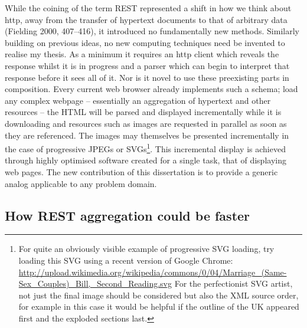 \documentclass[]{article}
\begin{document}
While the coining of the term REST represented a shift in how we think
about http, away from the transfer of hypertext documents to that of
arbitrary data (Fielding 2000, 407--416), it introduced no fundamentally
new methods. Similarly building on previous ideas, no new computing
techniques need be invented to realise my thesis. As a minimum it
requires an http client which reveals the response whilst it is in
progress and a parser which can begin to interpret that response before
it sees all of it. Nor is it novel to use these preexisting parts in
composition. Every current web browser already implements such a schema;
load any complex webpage -- essentially an aggregation of hypertext and
other resources -- the HTML will be parsed and displayed incrementally
while it is downloading and resources such as images are requested in
parallel as soon as they are referenced. The images may themselves be
presented incrementally in the case of progressive JPEGs or
SVGs\footnote{For quite an obviously visible example of progressive SVG
  loading, try loading this SVG using a recent version of Google Chrome:
  \url{http://upload.wikimedia.org/wikipedia/commons/0/04/Marriage_(Same-Sex_Couples)_Bill,_Second_Reading.svg}
  For the perfectionist SVG artist, not just the final image should be
  considered but also the XML source order, for example in this case it
  would be helpful if the outline of the UK appeared first and the
  exploded sections last.}. This incremental display is achieved through
highly optimised software created for a single task, that of displaying
web pages. The new contribution of this dissertation is to provide a
generic analog applicable to any problem domain.

\subsection{How REST aggregation could be faster}
\end{document}
